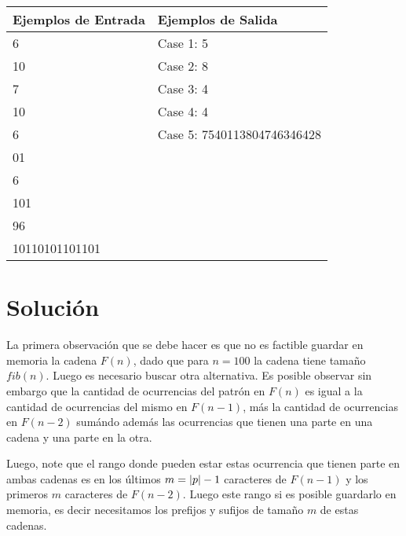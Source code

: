 \documentclass{article}
\begin{document}
\begin{titlepage}
\begin{statement}
		\smallskip
		\begin{center}
			\begin{tabular}{ | m{13em} | m{13em} | } 
				\hline
				Ejemplos de Entrada & Ejemplos de Salida          \\
				\hline
				6                   & Case 1: 5                   \\ 
				10                  & Case 2: 8                   \\ 
				7                   & Case 3: 4                   \\ 
				10                  & Case 4: 4                   \\ 
				6                   & Case 5: 7540113804746346428 \\ 
				01                  &                             \\ 
				6                   &                             \\ 
				101                 &                             \\ 
				96                  &                             \\ 
				10110101101101      &                             \\ 
				\hline
			\end{tabular}
		\end{center}
	\end{statement}
\end{titlepage}

\section*{Solución}

La primera observación que se debe hacer es que no es factible 
guardar en memoria la cadena $F(n)$, dado que para $n=100$ la 
cadena tiene tamaño $fib(n)$. Luego es necesario buscar otra 
alternativa. Es posible observar sin embargo que la cantidad de 
ocurrencias del patrón en $F(n)$ es igual a la cantidad de 
ocurrencias del mismo en $F(n-1)$, más la cantidad de ocurrencias 
en $F(n-2)$ sumándo además las ocurrencias que tienen una parte en 
una cadena y una parte en la otra.

Luego, note que el rango donde pueden estar estas ocurrencia que 
tienen parte en ambas cadenas es en los últimos $m = \left \vert p \right \vert-1$ 
caracteres de $F(n-1)$ y los primeros $m$ caracteres de $F(n-2)$. 
Luego este rango si es posible guardarlo en memoria, es decir 
necesitamos los prefijos y sufijos de tamaño $m$ de estas cadenas.
\end{document}
